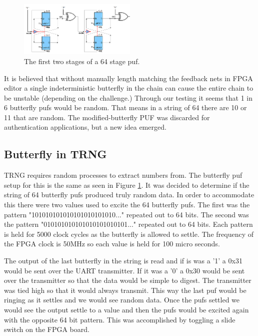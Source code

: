 		\begin{figure}[h]
			\centering
			\includegraphics[width=0.5\textwidth]{bflyString.png}
			\caption{The first two stages of a 64 stage puf.}\label{fig:bfly3}
		\end{figure}	
			
		It is believed that without manually length matching the feedback nets in FPGA editor a single indeterministic butterfly in the chain can cause the entire chain to be unstable (depending on the challenge.)  Through our testing it seems that 1 in 6 butterfly pufs would be random.  That means in a string of 64 there are 10 or 11 that are random.  The modified-butterfly PUF was discarded for authentication applications, but a new idea emerged.

	\subsection{Butterfly in TRNG}
		TRNG requires random processes to extract numbers from. The butterfly puf setup for this is the same as seen in Figure \ref{fig:bfly3}.  It was decided to determine if the string of 64 butterfly pufs produced truly random data.  In order to accommodate this there were two values used to excite the 64 butterfly pufs.  The first was the pattern "101010101010101010101010..." repeated out to 64 bits.  The second was the pattern "010101010101010101010101..." repeated out to 64 bits.  Each pattern is held for 5000 clock cycles as the butterfly is allowed to settle. The frequency of the FPGA clock is 50MHz so each value is held for 100 micro seconds.
		
		The output of the last butterfly in the string is read and if is was a '1' a 0x31 would be sent over the UART transmitter.  If it was a '0' a 0x30 would be sent over the transmitter so that the data would be simple to digest.  The transmitter was tied high so that it would always transmit.  This way the last puf would be ringing as it settles and we would see random data.  Once the pufs settled we would see the output settle to a value and then the pufs would be excited again with the opposite 64 bit pattern.  This was accomplished by toggling a slide switch on the FPGA board.
		
